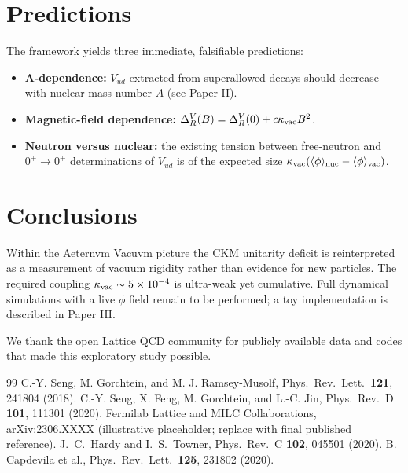 \documentclass[aps,prd,preprint,amsmath,amssymb]{revtex4-2}
\begin{document}
\section{Predictions}
The framework yields three immediate, falsifiable predictions:
\begin{itemize}
\item \textbf{A-dependence:} $V_{ud}$ extracted from superallowed decays should decrease with nuclear mass number $A$ (see Paper II).
\item \textbf{Magnetic-field dependence:} $\Delta_R^V(B)=\Delta_R^V(0)+c\kappa_{\rm vac}B^2$.
\item \textbf{Neutron versus nuclear:} the existing tension between free-neutron and $0^+\to0^+$ determinations of $V_{ud}$ is of the expected size $\kappa_{\rm vac}(\langle\phi\rangle_{\rm nuc}-\langle\phi\rangle_{\rm vac})$.
\end{itemize}

\section{Conclusions}
Within the Aeternvm Vacuvm picture the CKM unitarity deficit is reinterpreted as a measurement of vacuum rigidity rather than evidence for new particles. The required coupling $\kappa_{\rm vac}\sim5\times10^{-4}$ is ultra-weak yet cumulative. Full dynamical simulations with a live $\phi$ field remain to be performed; a toy implementation is described in Paper III.

\begin{acknowledgments}
We thank the open Lattice QCD community for publicly available data and codes that made this exploratory study possible.
\end{acknowledgments}

\begin{thebibliography}{99}
 C.-Y. Seng, M. Gorchtein, and M. J. Ramsey-Musolf, Phys.\ Rev.\ Lett.\ \textbf{121}, 241804 (2018).
 C.-Y. Seng, X. Feng, M. Gorchtein, and L.-C. Jin, Phys.\ Rev.\ D \textbf{101}, 111301 (2020).
 Fermilab Lattice and MILC Collaborations, arXiv:2306.XXXX (illustrative placeholder; replace with final published reference).
 J.\ C.\ Hardy and I.\ S.\ Towner, Phys.\ Rev.\ C \textbf{102}, 045501 (2020).
 B. Capdevila et al., Phys.\ Rev.\ Lett.\ \textbf{125}, 231802 (2020).
\end{thebibliography}
\end{document}
